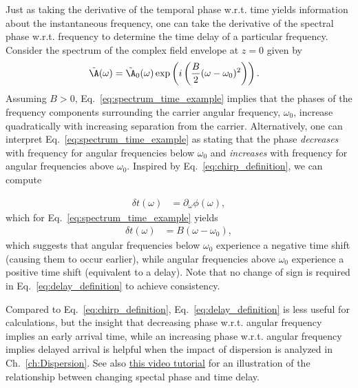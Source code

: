 Just as taking the derivative of the temporal phase w.r.t. time yields information about the instantaneous frequency, one can take the derivative of the spectral phase w.r.t. frequency to determine the time delay of a particular frequency. Consider the spectrum of the complex field envelope at $z=0$ given by
\begin{align}
\label{eq:spectrum_time_example}
    \Tilde{\A}(\omega) &= \Tilde{\A}_0(\omega)\exp\left( i\left(\frac{B}{2}(\omega-\omega_0)^2 \right)   \right).
\end{align}
Assuming $B>0$, Eq.~\ref{eq:spectrum_time_example} implies that the phases of the frequency components surrounding the carrier angular frequency, $\omega_0$, increase quadratically with increasing separation from the carrier. Alternatively, one can interpret Eq.~\ref{eq:spectrum_time_example} as stating that the phase \emph{decreases} with frequency for angular frequencies below $\omega_0$ and \emph{increases} with frequency for angular frequencies above $\omega_0$. Inspired by Eq.~\ref{eq:chirp_definition}, we can compute

\begin{align}
\label{eq:delay_definition}
    \delta t(\omega) &= \partial_\omega\phi(\omega),
\end{align}
which for Eq.~\ref{eq:spectrum_time_example} yields
\begin{align}
    \delta t(\omega) &=  B(\omega-\omega_0),
\end{align}
which suggests that angular frequencies below $\omega_0$ experience a negative time shift (causing them to occur earlier), while angular frequencies above $\omega_0$ experience a positive time shift (equivalent to a delay). Note that no change of sign is required in Eq.~\ref{eq:delay_definition} to achieve consistency. 

Compared to Eq.~\ref{eq:chirp_definition}, Eq.~\ref{eq:delay_definition} is less useful for calculations, but the insight that decreasing phase w.r.t. angular frequency implies an early arrival time, while an increasing phase w.r.t. angular frequency implies delayed arrival is helpful when the impact of dispersion is analyzed in Ch.~\ref{ch:Dispersion}. See also \href{https://youtu.be/E3S0BQiy3p8}{this video tutorial} for an illustration of the relationship between changing spectal phase and time delay.  
 






